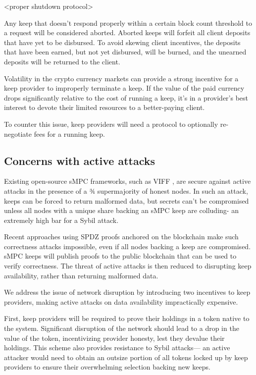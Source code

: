 \documentclass[11pt]{article}
\begin{document}
<proper shutdown protocol>

Any keep that doesn't respond properly within a certain block count
threshold to a request will be considered aborted. Aborted keeps will
forfeit all client deposits that have yet to be disbursed. To avoid
skewing client incentives, the deposits that have been earned, but not
yet disbursed, will be burned, and the unearned deposits will be
returned to the client.

Volatility in the crypto currency markets can provide a strong
incentive for a keep provider to improperly terminate a keep. If the
value of the paid currency drops significantly relative to the cost of
running a keep, it's in a provider's best interest to devote their
limited resources to a better-paying client.

To counter this issue, keep providers will need a protocol to
optionally re-negotiate fees for a running keep.

\subsection{Concerns with active attacks}
\label{activeAttacks}

Existing open-source sMPC frameworks, such as VIFF \cite{viff}, are
secure against active attacks in the presence of a ¾ supermajority of
honest nodes. In such an attack, keeps can be forced to return
malformed data, but secrets can't be compromised unless all nodes with
a unique share backing an sMPC keep are colluding- an extremely high
bar for a Sybil attack.

Recent approaches using SPDZ proofs \cite{spdz} anchored on the
blockchain \cite{bitcoinSmpc, blockchainMultipartyComputation} make
such correctness attacks impossible, even if all nodes backing a keep
are compromised. sMPC keeps will publish proofs to the public
blockchain that can be used to verify correctness. The threat of
active attacks is then reduced to disrupting keep availability, rather
than returning malformed data.

We address the issue of network disruption by introducing two
incentives to keep providers, making active attacks on data
availability impractically expensive.

First, keep providers will be required to prove their holdings in a
token native to the system. Significant disruption of the network
should lead to a drop in the value of the token, incentivizing
provider honesty, lest they devalue their holdings. This scheme also
provides resistance to Sybil attacks--- an active attacker would need to
obtain an outsize portion of all tokens locked up by keep providers to
ensure their overwhelming selection backing new keeps.
\end{document}
